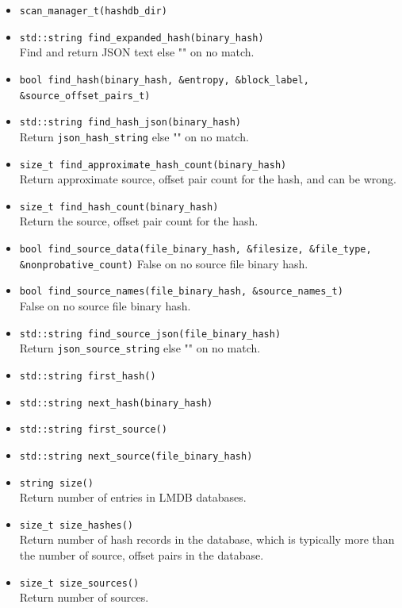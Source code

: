 \documentclass[11pt,fleqn]{article} %
\begin{document}
\begin{itemize}
\item \verb+scan_manager_t(hashdb_dir)+
\item \verb+std::string find_expanded_hash(binary_hash)+\\
Find and return JSON text else "" on no match.
\item \verb+bool find_hash(binary_hash, &entropy, &block_label, &source_offset_pairs_t)+\\
\item \verb+std::string find_hash_json(binary_hash)+\\
Return \verb+json_hash_string+ else "" on no match.
\item \verb+size_t find_approximate_hash_count(binary_hash)+\\
Return approximate source, offset pair count for the hash, and can be wrong.
\item \verb+size_t find_hash_count(binary_hash)+\\
Return the source, offset pair count for the hash.
\item \verb+bool find_source_data(file_binary_hash, &filesize, &file_type,+\\
\verb+&nonprobative_count)+
False on no source file binary hash.
\item \verb+bool find_source_names(file_binary_hash, &source_names_t)+\\
False on no source file binary hash.
\item \verb+std::string find_source_json(file_binary_hash)+\\
Return \verb+json_source_string+ else "" on no match.
\item \verb+std::string first_hash()+
\item \verb+std::string next_hash(binary_hash)+
\item \verb+std::string first_source()+
\item \verb+std::string next_source(file_binary_hash)+
\item \verb+string size()+\\
Return number of entries in LMDB databases.
\item \verb+size_t size_hashes()+\\
Return number of hash records in the database, which is typically more than the number of source, offset pairs in the database.
\item \verb+size_t size_sources()+\\
Return number of sources.
\end{itemize}
\end{document}
